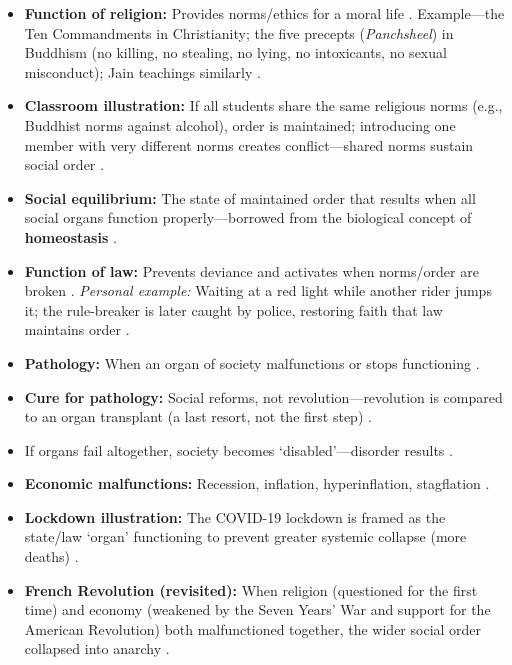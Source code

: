 \begin{ExampleBox}
\begin{itemize}
    \item \textbf{Function of religion:} Provides norms/ethics for a moral life . Example---the Ten Commandments in Christianity; the five precepts (\textit{Panchsheel}) in Buddhism (no killing, no stealing, no lying, no intoxicants, no sexual misconduct); Jain teachings similarly .
    \item \textbf{Classroom illustration:} If all students share the same religious norms (e.g., Buddhist norms against alcohol), order is maintained; introducing one member with very different norms creates conflict---shared norms sustain social order .
    \item \textbf{Social equilibrium:} The state of maintained order that results when all social organs function properly---borrowed from the biological concept of \textbf{homeostasis} .
    \item \textbf{Function of law:} Prevents deviance and activates when norms/order are broken . \textit{Personal example:} Waiting at a red light while another rider jumps it; the rule-breaker is later caught by police, restoring faith that law maintains order .
    \item \textbf{Pathology:} When an organ of society malfunctions or stops functioning .
    \item \textbf{Cure for pathology:} Social reforms, not revolution---revolution is compared to an organ transplant (a last resort, not the first step) .
\end{itemize}
\end{ExampleBox}

\begin{CriticalPoint}
\begin{itemize}
    \item If organs fail altogether, society becomes `disabled'---disorder results .
    \item \textbf{Economic malfunctions:} Recession, inflation, hyperinflation, stagflation .
    \item \textbf{Lockdown illustration:} The COVID-19 lockdown is framed as the state/law `organ' functioning to prevent greater systemic collapse (more deaths) .
    \item \textbf{French Revolution (revisited):} When religion (questioned for the first time) and economy (weakened by the Seven Years' War and support for the American Revolution) both malfunctioned together, the wider social order collapsed into anarchy .
\end{itemize}
\end{CriticalPoint}

